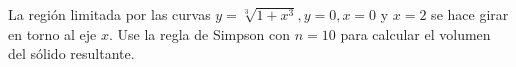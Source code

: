 \item La región limitada por las curvas $y = \sqrt[3]{1 + x^3}, y = 0, x = 0$ y $x = 2$ se hace girar en torno al eje $x$. Use la regla de Simpson con $n = 10$ para calcular el volumen del sólido resultante.
